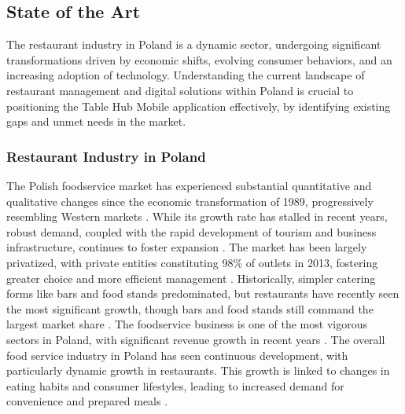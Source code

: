 \documentclass{article}
\begin{document}
\subsection{State of the Art}
The restaurant industry in Poland is a dynamic sector, undergoing significant transformations driven by economic shifts, evolving consumer behaviors, and an increasing adoption of technology. Understanding the current landscape of restaurant management and digital solutions within Poland is crucial to positioning the Table Hub Mobile application effectively, by identifying existing gaps and unmet needs in the market.

\subsubsection{Restaurant Industry in Poland}
The Polish foodservice market has experienced substantial quantitative and qualitative changes since the economic transformation of 1989, progressively resembling Western markets \parencite{kowalczuk2015eating}. While its growth rate has stalled in recent years, robust demand, coupled with the rapid development of tourism and business infrastructure, continues to foster expansion \parencite{kowalczuk2015eating}. The market has been largely privatized, with private entities constituting 98\% of outlets in 2013, fostering greater choice and more efficient management \parencite{kowalczuk2015eating}. Historically, simpler catering forms like bars and food stands predominated, but restaurants have recently seen the most significant growth, though bars and food stands still command the largest market share \parencite{kowalczuk2015eating}. The foodservice business is one of the most vigorous sectors in Poland, with significant revenue growth in recent years \parencite{gheribi2017foodservice}. The overall food service industry in Poland has seen continuous development, with particularly dynamic growth in restaurants. This growth is linked to changes in eating habits and consumer lifestyles, leading to increased demand for convenience and prepared meals \parencite{kowrygo2011development}.
\end{document}
